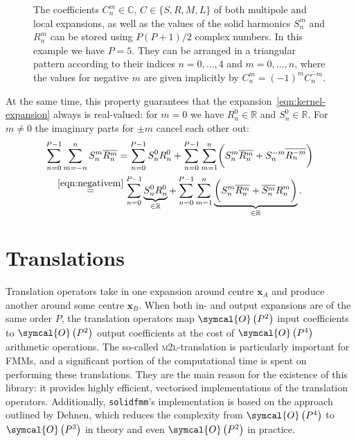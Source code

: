 \documentclass{scrbook}
\newcommand{\solidfmm}{\texttt{solidfmm}}
\newcommand{\MtoL}{\textsc{m2l}}
\newcommand{\reals}{\ensuremath{\mathbb{R}}}
\newcommand{\complex}{\mathbb{C}}
\newcommand{\vv}[1]{\ensuremath{\symbf{#1}}} %
\newcommand{\bigO}[1]{\ensuremath{\symcal{O}\left({#1}\right)}}
\begin{document}
\begin{figure}
\centering
{}
\caption{\label{fig:triangle}The coefficients $C_n^m\in\complex$,
$C\in\lbrace S, R, M, L\rbrace$ of both multipole and local expansions, as well
as the values of the solid harmonics $S_n^m$ and $R_n^m$ can be stored using
$P(P+1)/2$ complex numbers. In this example we have $P=5$. They can be arranged
in a triangular pattern according to their indices $n=0,\dotsc,4$ and
$m=0,\dotsc,n$, where the values for negative $m$ are given implicitly by
$C_n^{m}=(-1)^m\overline{C_n^{-m}}$.}
\end{figure}


At the same time, this property guarantees that the
expansion~\eqref{eqn:kernel-expansion} always is real-valued: for $m=0$ we have
$R_n^0\in\reals$ and $S_n^0\in\reals$. For $m\neq 0$ the imaginary parts for
$\pm m$ cancel each other out:
\begin{multline}
\sum_{n=0}^{P-1}\sum_{m=-n\vphantom{0}}^n S_n^m\overline{R_n^m} 
=
\sum_{n=0}^{P-1}S_n^0 R_n^0 +
\sum_{n=0}^{P-1}\sum_{m=1\vphantom{0}}^n \biggl(S_n^m\overline{R_n^m}+
S_n^{-m}\overline{R_n^{-m}}\biggr)\\
\stackrel{\eqref{eqn:negativem}}{=}
\sum_{n=0}^{P-1}\underbrace{S_n^0R_n^0}_{\in\reals} +
\sum_{n=0}^{P-1}\sum_{m=1\vphantom{0}}^n
\underbrace{\biggl(S_n^m\overline{R_n^m}+
\overline{S_n^m}R_n^m\biggr)}_{\in\reals}.
\end{multline}



\section{Translations}
Translation operators take in one expansion around centre $\vv{x}_A$ and produce
another around some centre $\vv{x}_B$. When both in- and output expansions are
of the same order $P$, the translation operators map \bigO{P^2} input 
coefficients to \bigO{P^2} output coefficients at the cost of \bigO{P^4}
arithmetic operations. The so-called \MtoL-translation is particularly
important for FMMs, and a significant portion of the computational time is
spent on performing these translations. They are the main reason for the
existence of this library: it provides highly efficient, vectorised 
implementations of the translation operators. Additionally, \solidfmm's
implementation is based on the approach outlined by
Dehnen,\autocite{dehnen2014} which reduces the complexity from \bigO{P^4} to
\bigO{P^3} in theory and even \bigO{P^2} in practice.
\end{document}
